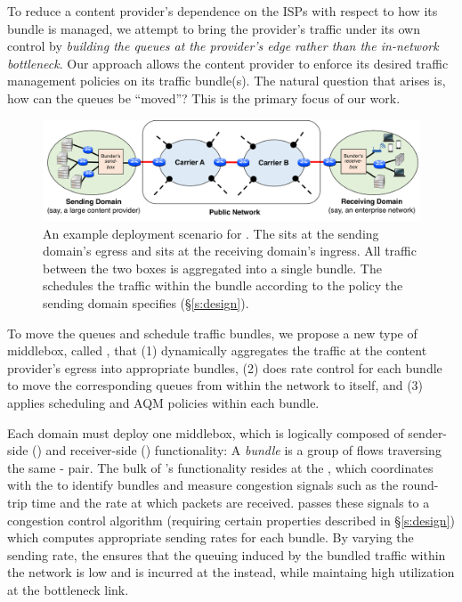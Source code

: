 To reduce a content provider's dependence on the ISPs with respect to how its bundle is managed, we attempt to bring the provider's traffic under its own control by \emph{building the queues at the provider's edge rather than the in-network bottleneck}.
Our approach allows the content provider to enforce its desired traffic management policies on its traffic bundle(s).
The natural question that arises is, how can the queues be ``moved''? This is the primary focus of our work. 

\begin{figure}[t]
    \centering
    \includegraphics[width=\textwidth]{img/deployment-arch.pdf}
    \caption{An example deployment scenario for \name. 
    The \inbox sits at the sending domain's egress and \outbox sits at the receiving domain's ingress. All traffic between the two boxes is aggregated into a single bundle. The \inbox schedules the traffic within the bundle according to the policy the sending domain specifies (\S\ref{s:design}).
    }\label{fig:deploy:arch}
\end{figure}

To move the queues and schedule traffic bundles, we propose a new type of middlebox, called \name, that (1) dynamically aggregates the traffic at the content provider's egress into appropriate bundles, (2) does rate control for each bundle to move the corresponding queues from within the network to itself, and (3) applies scheduling and AQM policies within each bundle. 

Each domain must deploy one middlebox, which is logically composed of sender-side (\inbox) and receiver-side (\outbox) functionality:
A \emph{bundle} is a group of flows traversing the same \inbox{}-\outbox{} pair.
The bulk of \name's functionality resides at the \inbox, which coordinates with the \outbox to identify bundles and measure congestion signals such as the round-trip time and the rate at which packets are received.
\inbox passes these signals to a congestion control algorithm (requiring certain properties described in \S\ref{s:design}) which computes appropriate sending rates for each bundle. 
By varying the sending rate, the \inbox ensures that the queuing induced by the bundled traffic within the network is low and is incurred at the \inbox instead, while maintaing high utilization at the bottleneck link.
 
